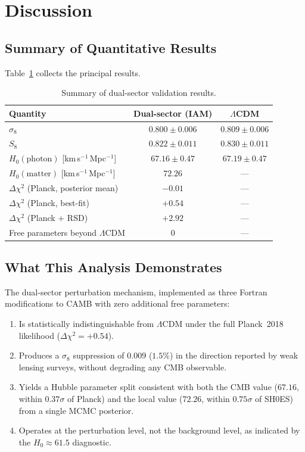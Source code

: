 \documentclass[11pt]{article}
\begin{document}
\section{Discussion}
\label{sec:discussion}

\subsection{Summary of Quantitative Results}

Table~\ref{tab:summary} collects the principal results.

\begin{table}[h]
\centering
\caption{Summary of dual-sector validation results.}
\begin{tabular}{lcc}
\toprule
Quantity & Dual-sector (IAM) & $\Lambda$CDM \\
\midrule
$\sigma_8$ & $0.800 \pm 0.006$ & $0.809 \pm 0.006$ \\
$S_8$ & $0.822 \pm 0.011$ & $0.830 \pm 0.011$ \\
$H_0(\mathrm{photon})$ [km\,s$^{-1}$\,Mpc$^{-1}$]
  & $67.16 \pm 0.47$ & $67.19 \pm 0.47$ \\
$H_0(\mathrm{matter})$ [km\,s$^{-1}$\,Mpc$^{-1}$]
  & $72.26$ & --- \\
$\Delta\chi^2$ (Planck, posterior mean) & $-0.01$ & --- \\
$\Delta\chi^2$ (Planck, best-fit) & $+0.54$ & --- \\
$\Delta\chi^2$ (Planck + RSD) & $+2.92$ & --- \\
Free parameters beyond $\Lambda$CDM & 0 & --- \\
\bottomrule
\end{tabular}
\label{tab:summary}
\end{table}

\subsection{What This Analysis Demonstrates}

The dual-sector perturbation mechanism, implemented as three Fortran
modifications to CAMB with zero additional free parameters:
\begin{enumerate}
\item Is statistically indistinguishable from $\Lambda$CDM under the
  full Planck~2018 likelihood ($\Delta\chi^2 = +0.54$).
\item Produces a $\sigma_8$ suppression of $0.009$ ($1.5\%$) in the
  direction reported by weak lensing surveys, without degrading any
  CMB observable.
\item Yields a Hubble parameter split consistent with both the CMB
  value ($67.16$, within $0.37\sigma$ of Planck) and the local value
  ($72.26$, within $0.75\sigma$ of SH0ES) from a single MCMC
  posterior.
\item Operates at the perturbation level, not the
  background level, as indicated by the $H_0 \approx 61.5$ diagnostic.
\end{enumerate}
\end{document}
